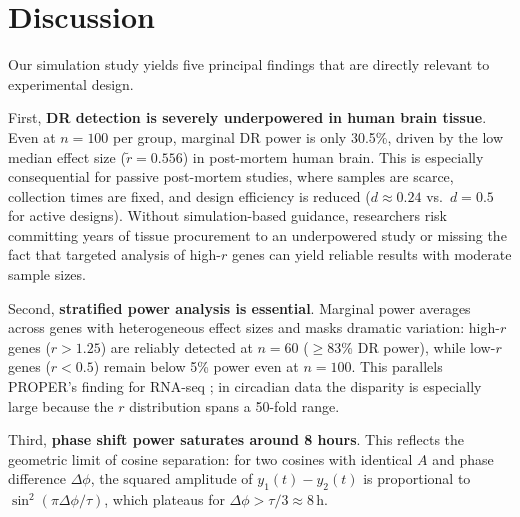 \documentclass{article}
\begin{document}
\section{Discussion}

Our simulation study yields five principal findings that are directly relevant to experimental design.

First, \textbf{DR detection is severely underpowered in human brain tissue}. Even at $n = 100$ per group, marginal DR power is only 30.5\%, driven by the low median effect size ($\tilde{r} = 0.556$) in post-mortem human brain. This is especially consequential for passive post-mortem studies, where samples are scarce, collection times are fixed, and design efficiency is reduced ($d \approx 0.24$ vs.\ $d = 0.5$ for active designs). Without simulation-based guidance, researchers risk committing years of tissue procurement to an underpowered study or missing the fact that targeted analysis of high-$r$ genes can yield reliable results with moderate sample sizes.

Second, \textbf{stratified power analysis is essential}. Marginal power averages across genes with heterogeneous effect sizes and masks dramatic variation: high-$r$ genes ($r > 1.25$) are reliably detected at $n = 60$ ($\geq$83\% DR power), while low-$r$ genes ($r < 0.5$) remain below 5\% power even at $n = 100$. This parallels PROPER's finding for RNA-seq \cite{wu2015proper}; in circadian data the disparity is especially large because the $r$ distribution spans a 50-fold range.

Third, \textbf{phase shift power saturates around 8 hours}. This reflects the geometric limit of cosine separation: for two cosines with identical $A$ and phase difference $\Delta\phi$, the squared amplitude of $y_1(t) - y_2(t)$ is proportional to $\sin^2(\pi\Delta\phi/\tau)$, which plateaus for $\Delta\phi > \tau/3 \approx 8$\,h.
\end{document}
